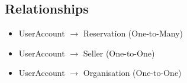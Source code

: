 \documentclass[a4paper,11pt]{article}
\begin{document}
\subsection*{Relationships}
\begin{itemize}
  \item UserAccount $\rightarrow$ Reservation (One-to-Many)
  \item UserAccount $\rightarrow$ Seller (One-to-One)
  \item UserAccount $\rightarrow$ Organisation (One-to-One)

\end{itemize}
\end{document}
